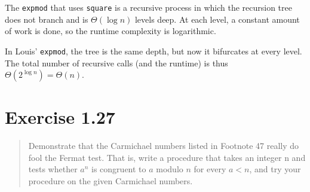 \documentclass{article}
\begin{document}
The \texttt{expmod} that uses \texttt{square} is a recursive process in which
the recursion tree does not branch and is $\Theta(\log{n})$ levels deep. At each
level, a constant amount of work is done, so the runtime complexity is
logarithmic.

In Louis' \texttt{expmod}, the tree is the same depth, but now it bifurcates at
every level. The total number of recursive calls (and the runtime) is thus
$\Theta(2^{\log{n}})=\Theta(n)$.

\section{Exercise 1.27}
\begin{quote}
	Demonstrate that the Carmichael numbers listed in Footnote 47 really do
	fool the Fermat test. That is, write a procedure that takes an integer n and
	tests whether $a^n$ is congruent to $a$ modulo $n$ for every $a<n$, and try
	your procedure on the given Carmichael numbers.
\end{quote}


\end{document}
